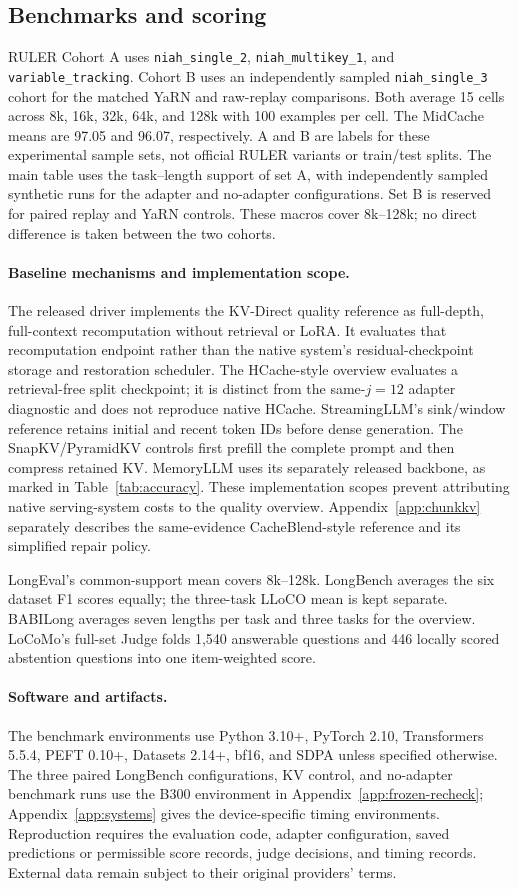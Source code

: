 \subsection{Benchmarks and scoring}

RULER Cohort A uses \texttt{niah\_single\_2}, \texttt{niah\_multikey\_1}, and \texttt{variable\_tracking}. Cohort B uses an independently sampled \texttt{niah\_single\_3} cohort for the matched YaRN and raw-replay comparisons. Both average 15 cells across 8k, 16k, 32k, 64k, and 128k with 100 examples per cell. The MidCache means are 97.05 and 96.07, respectively. A and B are labels for these experimental sample sets, not official RULER variants or train/test splits. The main table uses the task--length support of set A, with independently sampled synthetic runs for the adapter and no-adapter configurations. Set B is reserved for paired replay and YaRN controls. These macros cover 8k--128k; no direct difference is taken between the two cohorts.

\paragraph{Baseline mechanisms and implementation scope.}
The released driver implements the KV-Direct quality reference as full-depth, full-context recomputation without retrieval or LoRA. It evaluates that recomputation endpoint rather than the native system's residual-checkpoint storage and restoration scheduler. The HCache-style overview evaluates a retrieval-free split checkpoint; it is distinct from the same-$j=12$ adapter diagnostic and does not reproduce native HCache. StreamingLLM's sink/window reference retains initial and recent token IDs before dense generation. The SnapKV/PyramidKV controls first prefill the complete prompt and then compress retained KV. MemoryLLM uses its separately released backbone, as marked in Table~\ref{tab:accuracy}. These implementation scopes prevent attributing native serving-system costs to the quality overview. Appendix~\ref{app:chunkkv} separately describes the same-evidence CacheBlend-style reference and its simplified repair policy.

LongEval's common-support mean covers 8k--128k. LongBench averages the six dataset F1 scores equally; the three-task LLoCO mean is kept separate. BABILong averages seven lengths per task and three tasks for the overview. LoCoMo's full-set Judge folds 1,540 answerable questions and 446 locally scored abstention questions into one item-weighted score.

\paragraph{Software and artifacts.}
The benchmark environments use Python 3.10+, PyTorch 2.10, Transformers 5.5.4, PEFT 0.10+, Datasets 2.14+, bf16, and SDPA unless specified otherwise. The three paired LongBench configurations, KV control, and no-adapter benchmark runs use the B300 environment in Appendix~\ref{app:frozen-recheck}; Appendix~\ref{app:systems} gives the device-specific timing environments. Reproduction requires the evaluation code, adapter configuration, saved predictions or permissible score records, judge decisions, and timing records. External data remain subject to their original providers' terms.
